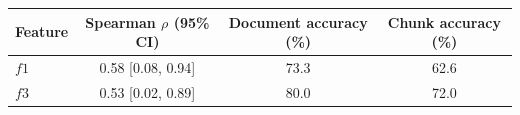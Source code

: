 \begin{tabular}{lccc}
\toprule
Feature & Spearman $\rho$ (95\% CI) & Document accuracy (\%) & Chunk accuracy (\%) \\
\midrule
$f1$ & 0.58 [0.08, 0.94] & 73.3 & 62.6 \\
$f3$ & 0.53 [0.02, 0.89] & 80.0 & 72.0 \\
\bottomrule
\end{tabular}
